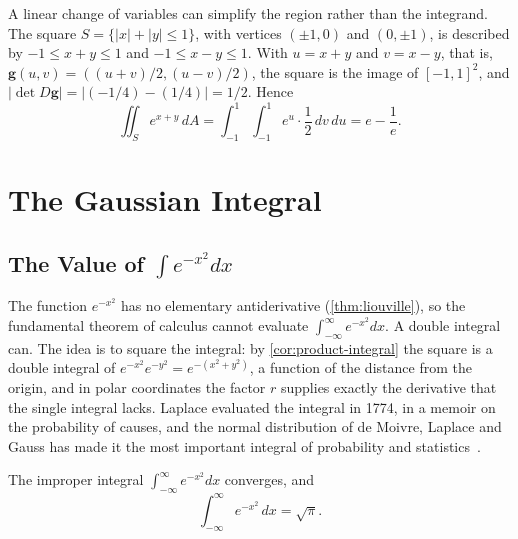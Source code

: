 A linear change of variables can simplify the region rather than the integrand. The square $S=\{|x|+|y|\le1\}$, with vertices $(\pm1,0)$ and $(0,\pm1)$, is described by $-1\le x+y\le1$ and $-1\le x-y\le1$. With $u=x+y$ and $v=x-y$, that is, $\mathbf g(u,v)=((u+v)/2,(u-v)/2)$, the square is the image of $[-1,1]^2$, and $|\det D\mathbf g|=|(-1/4)-(1/4)|=1/2$. Hence
\[
\iint_Se^{x+y}\,dA=\int_{-1}^1\int_{-1}^1e^u\cdot\frac12\,dv\,du=e-\frac1e .
\]

\section{The Gaussian Integral}
\label{sec:gaussian}

\subsection{The Value of \texorpdfstring{$\int e^{-x^2}dx$}{the Gaussian Integral}}

The function $e^{-x^2}$ has no elementary antiderivative (\cref{thm:liouville}), so the fundamental theorem of calculus cannot evaluate $\int_{-\infty}^\infty e^{-x^2}dx$. A double integral can. The idea is to square the integral: by \cref{cor:product-integral} the square is a double integral of $e^{-x^2}e^{-y^2}=e^{-(x^2+y^2)}$, a function of the distance from the origin, and in polar coordinates the factor $r$ supplies exactly the derivative that the single integral lacks. Laplace evaluated the integral in 1774, in a memoir on the probability of causes, and the normal distribution of de Moivre, Laplace and Gauss has made it the most important integral of probability and statistics~\cite{stigler1986}.

\begin{theorem}
\label{thm:gaussian}
The improper integral $\int_{-\infty}^\infty e^{-x^2}dx$ converges, and
\[
\int_{-\infty}^\infty e^{-x^2}\,dx=\sqrt\pi .
\]
\end{theorem}

